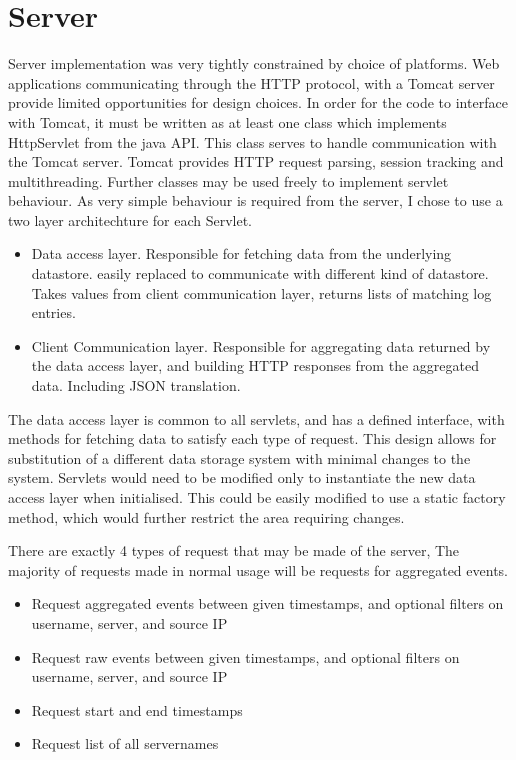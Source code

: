 \section{Server}
Server implementation was very tightly constrained by choice of platforms. Web applications communicating through the HTTP protocol, with a Tomcat server provide limited opportunities for design choices.
In order for the code to interface with Tomcat, it must be written as at least one class which implements HttpServlet from the java API. 
This class serves to handle communication with the Tomcat server. Tomcat provides HTTP request parsing, session tracking and multithreading. Further classes may be used freely to implement servlet behaviour. As very simple behaviour is required from the server, I chose to use a two layer architechture for each Servlet. 
\begin{itemize}
\item{Data access layer. Responsible for fetching data from the underlying datastore. easily replaced to communicate with different kind of datastore. Takes values from client communication layer, returns lists of matching log entries.}
\item{Client Communication layer. Responsible for aggregating data returned by the data access layer, and building HTTP responses from the aggregated data. Including JSON translation.}
\end{itemize}
The data access layer is common to all servlets, and has a defined interface, with methods for fetching data to satisfy each type of request. This design allows for substitution of a different data storage system with minimal changes to the system. Servlets would need to be modified only to instantiate the new data access layer when initialised. This could be easily modified to use a static factory method, which would further restrict the area requiring changes.

There are exactly 4 types of request that may be made of the server, The majority of requests made in normal usage will be requests for aggregated events. 
\begin{itemize}
\item{Request aggregated events between given timestamps, and optional filters on username, server, and source IP}
\item{Request raw events between given timestamps, and optional filters on username, server, and source IP}
\item{Request start and end timestamps}
\item{Request list of all servernames}
\end{itemize}

